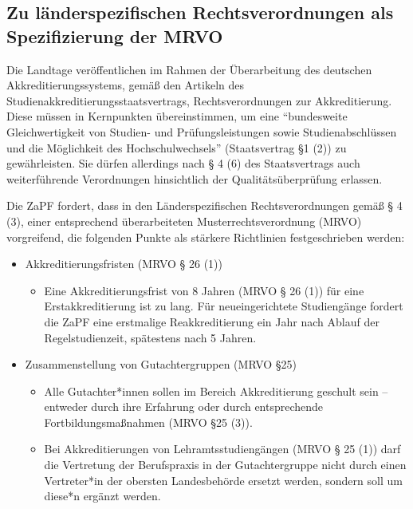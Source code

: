 
\subsection*{Zu länderspezifischen Rechtsverordnungen als Spezifizierung der MRVO}
Die Landtage veröffentlichen im Rahmen der Überarbeitung des deutschen Akkreditierungssystems, gemäß den Artikeln des Studienakkreditierungsstaatsvertrags, Rechtsverordnungen zur Akkreditierung.\\
Diese müssen in Kernpunkten übereinstimmen, um eine "`bundesweite Gleichwertigkeit von Studien- und Prüfungsleistungen sowie Studienabschlüssen und die Möglichkeit des Hochschulwechsels"' (Staatsvertrag §1 (2)) zu gewährleisten. Sie dürfen allerdings nach § 4 (6) des Staatsvertrags auch weiterführende Verordnungen hinsichtlich der Qualitätsüberprüfung erlassen.

Die ZaPF fordert, dass in den Länderspezifischen Rechtsverordnungen gemäß § 4 (3), einer entsprechend überarbeiteten Musterrechtsverordnung (MRVO) vorgreifend, die folgenden Punkte als stärkere Richtlinien festgeschrieben werden:

\begin{itemize}
\item Akkreditierungsfristen (MRVO § 26 (1))
	\begin{itemize}
    \item Eine Akkreditierungsfrist von 8 Jahren (MRVO § 26 (1)) für eine Erstakkreditierung ist zu lang. Für neueingerichtete Studiengänge fordert die ZaPF eine erstmalige Reakkreditierung ein Jahr nach Ablauf der Regelstudienzeit, spätestens nach 5 Jahren.
    \end{itemize}
\item Zusammenstellung von Gutachtergruppen (MRVO §25)
	\begin{itemize}
    \item Alle Gutachter*innen sollen im Bereich Akkreditierung geschult sein -- entweder durch ihre Erfahrung oder durch entsprechende Fortbildungsmaßnahmen (MRVO §25 (3)).
    \item Bei Akkreditierungen von Lehramtsstudiengängen (MRVO § 25 (1)) darf die Vertretung der Berufspraxis in der Gutachtergruppe nicht durch einen Vertreter*in der obersten Landesbehörde ersetzt werden, sondern soll um diese*n ergänzt werden.
    \end{itemize}
\end{itemize}
